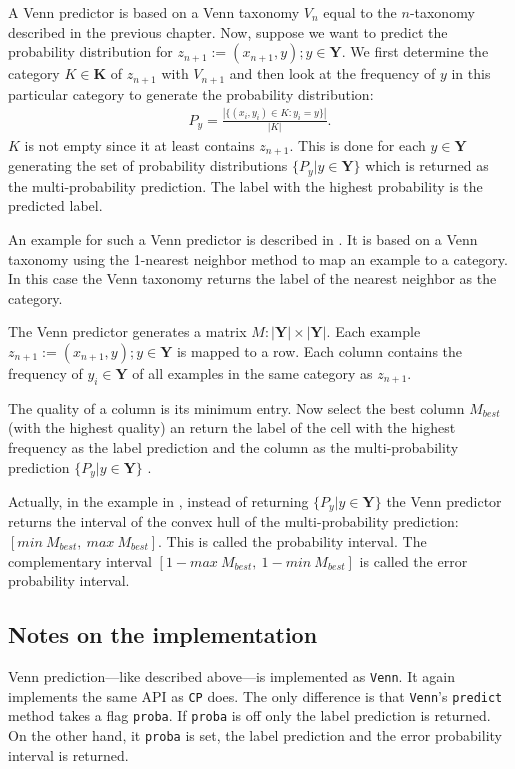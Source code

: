 \documentclass[twoside,11pt]{article}
\begin{document}
A Venn predictor is based on a Venn taxonomy $V_n$ equal to
the $n$-taxonomy described in the previous chapter. Now,
suppose we want to predict the probability distribution for
$z_{n+1} := (x_{n+1}, y); y \in \textbf{Y}$.
We first determine the category $K \in \textbf{K}$ of
$z_{n+1}$ with $V_{n+1}$ and then look at the frequency of
$y$ in this particular category to generate the probability
distribution:
\begin{align*}
P_y = \frac{|\{(x_i,y_i) \in K: y_i = y\}|}{|K|}.
\end{align*}
$K$ is not empty since it at least contains $z_{n+1}$.
This is done for each $y \in \textbf{Y}$ generating the
set of probability distributions
$\{P_y|y \in \textbf{Y}\}$ which is returned as the
multi-probability prediction. The label with the highest
probability is the predicted label.

An example for such a Venn predictor is described in
\citet[Chapter 6.3]{alrw}. It is based on a Venn taxonomy
using the 1-nearest neighbor method to map an example to a
category.
In this case the Venn taxonomy returns the label of the
nearest neighbor as the category.

The Venn predictor generates a matrix
$M:|\textbf{Y}| \times |\textbf{Y}|$. Each example
$z_{n+1} := (x_{n+1},y);y \in \textbf{Y}$ is mapped to a
row.
Each column contains the frequency of $y_i \in \textbf{Y}$
of all examples in the same category as $z_{n+1}$.

The quality of a column is its minimum entry. Now select
the best column $M_{best}$ (with the highest quality) an
return the label of the cell with the highest frequency as
the label prediction and the column as the
multi-probability prediction $\{P_y|y\in \textbf{Y}\}$
\citep[see][Chapter 6.3]{alrw}.

Actually, in the example in \citet[Chapter 6.3]{alrw},
instead of returning $\{P_y|y\in \textbf{Y}\}$ the Venn
predictor returns the interval of the convex hull of the
multi-probability prediction:
$[min\ M_{best},\ max\ M_{best}]$.
This is called the probability interval. The complementary
interval $[1-max\ M_{best},\ 1-min\ M_{best}]$ is called
the error probability interval.

\subsection*{Notes on the implementation}

Venn prediction---like described above---is implemented as
\texttt{Venn}. It again implements the same API as
\texttt{CP} does. The only difference is that
\texttt{Venn}'s \texttt{predict} method takes a flag
\texttt{proba}. If \texttt{proba} is off only the label
prediction is returned. On the other hand, it
\texttt{proba} is set, the label prediction and the error
probability interval is returned.
\end{document}
